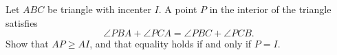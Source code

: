 Let $ABC$ be triangle with incenter $I$. A point $P$ in the interior of the triangle satisfies \[\angle PBA+\angle PCA = \angle PBC+\angle PCB.\] Show that $AP \geq AI$,  and that equality holds if and only if $P=I$.